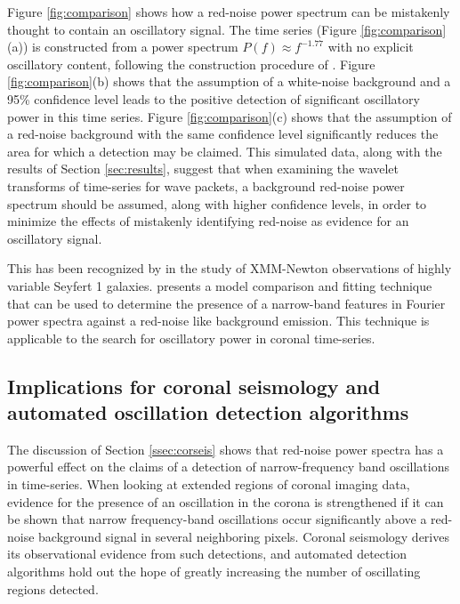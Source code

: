 \documentclass[manuscript]{../aastex52/aastex}
\begin{document}
Figure \ref{fig:comparison} shows how a red-noise power spectrum can
be mistakenly thought to contain an oscillatory signal.  The time
series (Figure \ref{fig:comparison}(a)) is constructed from a power
spectrum $P(f)\approx f^{-1.77}$ with no explicit oscillatory content,
following the construction procedure of \cite{vaughan2010}.  Figure
\ref{fig:comparison}(b) shows that the assumption of a white-noise
background and a 95\% confidence level leads to the positive detection
of significant oscillatory power in this time series. Figure
\ref{fig:comparison}(c) shows that the assumption of a red-noise
background with the same confidence level significantly reduces the
area for which a detection may be claimed.  This simulated data, along
with the results of Section \ref{sec:results}, suggest that when
examining the wavelet transforms of time-series for wave packets, a
background red-noise power spectrum should be assumed, along with
higher confidence levels, in order to minimize the effects of
mistakenly identifying red-noise as evidence for an oscillatory
signal.

This has been recognized by \cite{2010MNRAS.402..307V} in the study of
XMM-Newton observations of highly variable Seyfert 1 galaxies.
\cite{2010MNRAS.402..307V} presents a model comparison and fitting
technique that can be used to determine the presence of a narrow-band
features in Fourier power spectra against a red-noise like background
emission.  This technique is applicable to the search for oscillatory
power in coronal time-series.



\subsection{Implications for coronal seismology and automated
  oscillation detection algorithms}\label{sec:oscdetect}

The discussion of Section \ref{ssec:corseis} shows that red-noise
power spectra has a powerful effect on the claims of a detection of
narrow-frequency band oscillations in time-series.  When looking at
extended regions of coronal imaging data, evidence for the presence of
an oscillation in the corona is strengthened if it can be shown that
narrow frequency-band oscillations occur significantly above a
red-noise background signal in several neighboring pixels.  Coronal
seismology derives its observational evidence from such detections,
and automated detection algorithms hold out the hope of greatly
increasing the number of oscillating regions detected.
\end{document}
